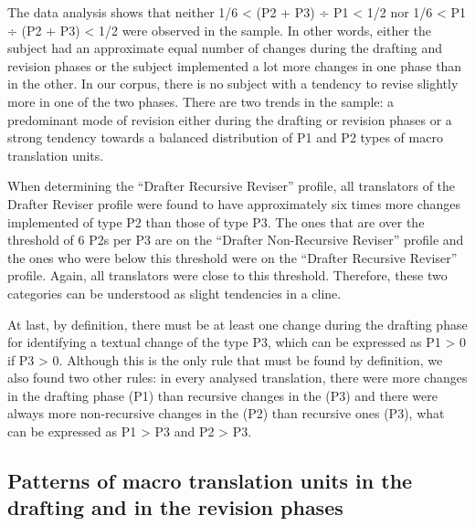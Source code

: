 \documentclass[output=paper]{LSP/langsci}
\begin{document}
The data analysis shows that neither 1/6 {\textless} (P2 + P3) ÷ P1 {\textless} 1/2 nor 1/6 {\textless} P1 ÷ (P2 + P3) {\textless} 1/2 were observed in the sample. In other words, either the subject had an approximate equal number of changes during the drafting and revision phases or the subject implemented a lot more changes in one phase than in the other. In our corpus, there is no subject with a tendency to revise slightly more in one of the two phases. There are two trends in the sample: a predominant mode of revision either during the drafting or revision phases or a strong tendency towards a balanced distribution of  P1 and P2 types of macro translation units.

When determining the ``Drafter Recursive Reviser'' profile, all translators of the Drafter Reviser profile were found to have approximately six times more changes implemented of type P2 than those of type P3. The ones that are over the threshold of 6 P2s per P3 are on the ``Drafter Non-Recursive Reviser'' profile and the ones who were below this threshold were on the ``Drafter Recursive Reviser'' profile. Again, all translators were close to this threshold. Therefore, these two categories can be understood as slight tendencies in a cline.

At last, by definition, there must be at least one change during the drafting phase for identifying a textual change of the type P3, which can be expressed as P1 {\textgreater} 0 if P3 {\textgreater} 0. Although this is the only rule that must be found by definition, we also found two other rules: in every analysed translation, there were more changes in the drafting phase (P1) than recursive changes in the  (P3) and there were always more non-recursive changes in the  (P2) than recursive ones (P3), what can be expressed as P1 {\textgreater} P3 and P2 {\textgreater} P3.

\subsection{Patterns of macro translation units in the drafting and in the revision phases}\label{sec:alves:4.3}
\end{document}
